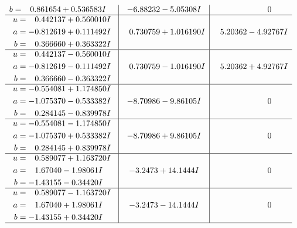 \documentclass[1p]{elsarticle_modified}
\theoremstyle{definition}
\begin{document}
$$\begin{array}{c|c|c}
\begin{aligned}
b &= \phantom{-}0.861654 + 0.536583 I\end{aligned}
 & -6.88232 - 5.05308 I & \phantom{-0.000000 } 0 \\ \hline\begin{aligned}
u &= \phantom{-}0.442137 + 0.560010 I \\
a &= -0.812619 + 0.111492 I \\
b &= \phantom{-}0.366660 + 0.363322 I\end{aligned}
 & \phantom{-}0.730759 + 1.016190 I & \phantom{-}5.20362 - 4.92767 I \\ \hline\begin{aligned}
u &= \phantom{-}0.442137 - 0.560010 I \\
a &= -0.812619 - 0.111492 I \\
b &= \phantom{-}0.366660 - 0.363322 I\end{aligned}
 & \phantom{-}0.730759 - 1.016190 I & \phantom{-}5.20362 + 4.92767 I \\ \hline\begin{aligned}
u &= -0.554081 + 1.174850 I \\
a &= -1.075370 - 0.533382 I \\
b &= \phantom{-}0.284145 - 0.839978 I\end{aligned}
 & -8.70986 - 9.86105 I & \phantom{-0.000000 } 0 \\ \hline\begin{aligned}
u &= -0.554081 - 1.174850 I \\
a &= -1.075370 + 0.533382 I \\
b &= \phantom{-}0.284145 + 0.839978 I\end{aligned}
 & -8.70986 + 9.86105 I & \phantom{-0.000000 } 0 \\ \hline\begin{aligned}
u &= \phantom{-}0.589077 + 1.163720 I \\
a &= \phantom{-}1.67040 - 1.98061 I \\
b &= -1.43155 - 0.34420 I\end{aligned}
 & -3.2473 + 14.1444 I & \phantom{-0.000000 } 0 \\ \hline\begin{aligned}
u &= \phantom{-}0.589077 - 1.163720 I \\
a &= \phantom{-}1.67040 + 1.98061 I \\
b &= -1.43155 + 0.34420 I\end{aligned}
 & -3.2473 - 14.1444 I & \phantom{-0.000000 } 0\\
 \hline 
 \end{array}$$\newpage$$\begin{array}{c|c|c}  

\end{array}$$
\end{document}

